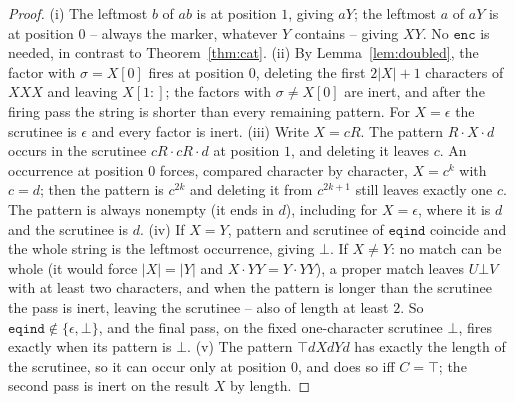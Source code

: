 \documentclass[runningheads,envcountsect]{llncs}
\begin{document}
\begin{proof}
    (i) The leftmost $b$ of $ab$ is at position $1$, giving $aY$; the leftmost $a$ of $aY$ is at position $0$ -- always the marker, whatever $Y$ contains -- giving $XY$. No $\mathtt{enc}$ is needed, in contrast to Theorem~\ref{thm:cat}. (ii) By Lemma~\ref{lem:doubled}, the factor with $\sigma = X[0]$ fires at position $0$, deleting the first $2|X|+1$ characters of $XXX$ and leaving $X[1:]$; the factors with $\sigma \neq X[0]$ are inert, and after the firing pass the string is shorter than every remaining pattern. For $X = \epsilon$ the scrutinee is $\epsilon$ and every factor is inert. (iii) Write $X = cR$. The pattern $R\cdot X\cdot d$ occurs in the scrutinee $cR\cdot cR\cdot d$ at position $1$, and deleting it leaves $c$. An occurrence at position $0$ forces, compared character by character, $X = c^k$ with $c = d$; then the pattern is $c^{2k}$ and deleting it from $c^{2k+1}$ still leaves exactly one $c$. The pattern is always nonempty (it ends in $d$), including for $X = \epsilon$, where it is $d$ and the scrutinee is $d$. (iv) If $X = Y$, pattern and scrutinee of $\mathtt{eqind}$ coincide and the whole string is the leftmost occurrence, giving $\bot$. If $X \neq Y$: no match can be whole (it would force $|X| = |Y|$ and $X\cdot YY = Y\cdot YY$), a proper match leaves $U\bot V$ with at least two characters, and when the pattern is longer than the scrutinee the pass is inert, leaving the scrutinee -- also of length at least $2$. So $\mathtt{eqind} \notin \{\epsilon, \bot\}$, and the final pass, on the fixed one-character scrutinee $\bot$, fires exactly when its pattern is $\bot$. (v) The pattern $\top dXdYd$ has exactly the length of the scrutinee, so it can occur only at position $0$, and does so iff $C = \top$; the second pass is inert on the result $X$ by length.
\end{proof}
\end{document}
